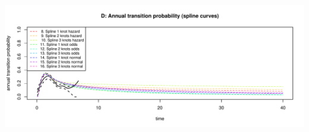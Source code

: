 \documentclass[
]{article}
\begin{document}
\begin{flushleft}\includegraphics[height=0.29\textheight]{Images/validate_extrapolation3-4} \end{flushleft}

\begin{table}


\end{table}
\end{document}
